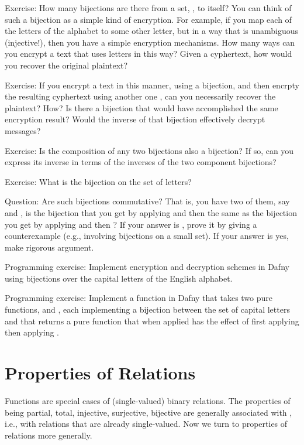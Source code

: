 \documentclass[letterpaper,10pt,english]{sphinxmanual}
\begin{document}
Exercise: How many bijections are there from a set, , to itself?
You can think of such a bijection as a simple kind of encryption. For
example, if you map each of the  letters of the alphabet to some
other letter, but in a way that is unambiguous (injective!), then you
have a simple encryption mechanisms. How many ways can you encrypt a
text that uses  letters in this way? Given a cyphertext, how would
you recover the original plaintext?

Exercise: If you encrypt a text in this manner, using a bijection,
 and then encrpty the resulting cyphertext using another one ,
can you necessarily recover the plaintext? How? Is there a 
bijection that would have accomplished the same encryption result?
Would the inverse of that bijection effectively decrypt messages?

Exercise: Is the composition of any two bijections also a bijection?
If so, can you express its inverse in terms of the inverses of the two
component bijections?

Exercise: What is the  bijection on the set of  letters?

Question: Are such bijections commutative? That is, you have two of
them, say  and , is the bijection that you get by applying 
and then  the same as the bijection you get by applying  and
then ? If your answer is , prove it by giving a counterexample
(e.g., involving bijections on a small set). If your answer is yes,
make rigorous argument.

Programming exercise: Implement encryption and decryption schemes in
Dafny using bijections over the  capital letters of the English
alphabet.

Programming exercise: Implement a  function in Dafny that
takes two pure functions,  and , each implementing a bijection
between the set of capital letters and that returns a pure function
that when applied has the effect of first applying  then applying
.


\section{Properties of Relations}
\label{\detokenize{07-set-theory:properties-of-relations}}
Functions are special cases of (single-valued) binary relations.  The
properties of being partial, total, injective, surjective, bijective
are generally associated with , i.e., with relations that
are already single-valued. Now we turn to properties of relations more
generally.
\end{document}
